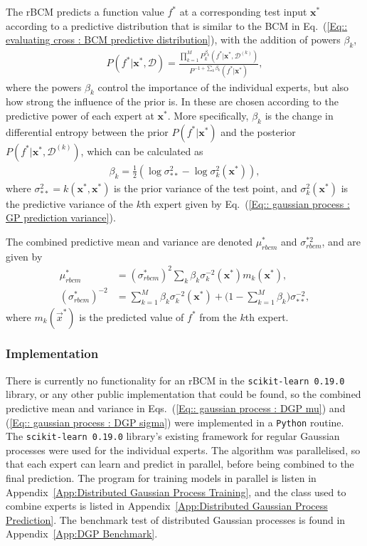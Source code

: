 \documentclass[twoside,english]{uiofysmaster}
\begin{document}
{{The rBCM predicts a function value $f^*$ at a corresponding test input $\textbf{x}^*$ according to a predictive distribution that is similar to the BCM in Eq.~(\ref{Eq:: evaluating cross : BCM predictive distribution}), with the addition of powers $\beta_k$,
\begin{align}
P(f^* | \textbf{x}^*, \mathcal{D}) = \frac{\prod_{k=1}^M P_k^{\beta_k} (f^*| \textbf{x}^*, \mathcal{D}^{(k)})}{P^{-1 + \sum_k \beta_k} (f^* | \textbf{x}^*)},
\end{align}
where the powers $\beta_k$ control the importance of the individual experts, but also how strong the influence of the prior is. In \cite{deisenroth2015distributed} these are chosen according to the predictive power of each expert at $\textbf{x}^*$. More specifically, $\beta_k$ is the change in differential entropy between the prior $P(f^* | \textbf{x}^*)$ and the posterior $P(f^* | \textbf{x}^*, \mathcal{D}^{(k)})$, which can be calculated as 
\begin{align}
\beta_k = \frac{1}{2} (\log \sigma_{**}^2 - \log \sigma^2_k(\textbf{x}^*) ),
\end{align}
where $\sigma_{**}^2 = k(\textbf{x}^*, \textbf{x}^*)$ is the prior variance of the test point, and $\sigma_k^2 (\textbf{x}^*)$ is the predictive variance of the $k$th expert given by Eq.~(\ref{Eq:: gaussian process : GP prediction variance}). 

The combined predictive mean and variance are denoted $\mu_{rbcm}^*$ and $\sigma^{*2}_{rbcm}$, and are given by
\begin{align}
\mu^*_{rbcm} &= (\sigma^*_{rbcm})^2 \sum_k \beta_k \sigma_k^{-2} (\textbf{x}^*) m_k (\textbf{x}^*),\label{Eq:: gaussian process : DGP mu} \\
(\sigma^*_{rbcm})^{-2} &= \sum_{k=1}^M \beta_k \sigma_k^{-2} (\textbf{x}^*) + \big(1 - \sum_{k=1}^M \beta_k \big) \sigma_{**}^{-2},\label{Eq:: gaussian process : DGP sigma}
\end{align}
where $m_k(\vec{x}^*)$ is the predicted value of $f^*$ from the $k$th expert.


\subsubsection{Implementation}

There is currently no functionality for an rBCM in the \verb|scikit-learn 0.19.0| library, or any other public implementation that could be found, so the combined predictive mean and variance in Eqs.~(\ref{Eq:: gaussian process : DGP mu}) and (\ref{Eq:: gaussian process : DGP sigma}) were implemented in a \verb|Python| routine. The \verb|scikit-learn 0.19.0| library's existing framework for regular Gaussian processes were used for the individual experts. The algorithm was parallelised, so that each expert can learn and predict in parallel, before being combined to the final prediction. The program for training models in parallel is listen in Appendix~\ref{App:Distributed Gaussian Process Training}, and the class used to combine experts is listed in Appendix~\ref{App:Distributed Gaussian Process Prediction}. The benchmark test of distributed Gaussian processes is found in Appendix~\ref{App:DGP Benchmark}.  

}}
\end{document}
